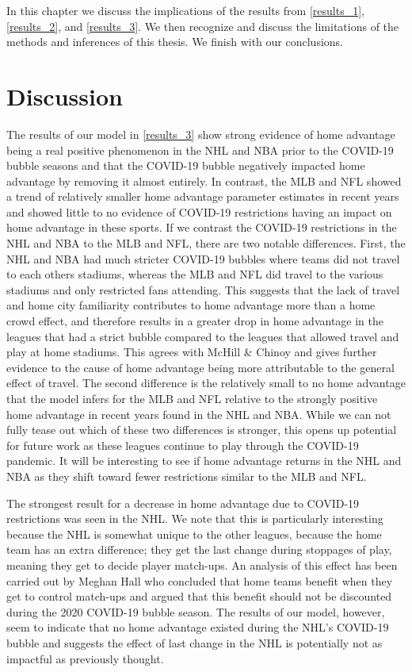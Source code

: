 In this chapter we discuss the implications of the results from \ref{results_1}, \ref{results_2}, and \ref{results_3}. We then recognize and discuss the limitations of the methods and inferences of this thesis. We finish with our conclusions.

\section{Discussion}

The results of our model in \ref{results_3} show strong evidence of home advantage being a real positive phenomenon in the NHL and NBA prior to the COVID-19 bubble seasons and that the COVID-19 bubble negatively impacted home advantage by removing it almost entirely. In contrast, the MLB and NFL showed a trend of relatively smaller home advantage parameter estimates in recent years and showed little to no evidence of COVID-19 restrictions having an impact on home advantage in these sports. If we contrast the COVID-19 restrictions in the NHL and NBA to the MLB and NFL, there are two notable differences. First, the NHL and NBA had much stricter COVID-19 bubbles where teams did not travel to each others stadiums, whereas the MLB and NFL did travel to the various stadiums and only restricted fans attending. This suggests that the lack of travel and home city familiarity contributes to home advantage more than a home crowd effect, and therefore results in a greater drop in home advantage in the leagues that had a strict bubble compared to the leagues that allowed travel and play at home stadiums. This agrees with McHill \& Chinoy \cite{McHill2020} and gives further evidence to the cause of home advantage being more attributable to the general effect of travel. The second difference is the relatively small to no home advantage that the model infers for the MLB and NFL relative to the strongly positive home advantage in recent years found in the NHL and NBA. While we can not fully tease out which of these two differences is stronger, this opens up potential for future work as these leagues continue to play through the COVID-19 pandemic. It will be interesting to see if home advantage returns in the NHL and NBA as they shift toward fewer restrictions similar to the MLB and NFL.

The strongest result for a decrease in home advantage due to COVID-19 restrictions was seen in the NHL. We note that this is particularly interesting because the NHL is somewhat unique to the other leagues, because the home team has an extra difference; they get the last change during stoppages of play, meaning they get to decide player match-ups. An analysis of this effect has been carried out by Meghan Hall \cite{Hall2020} who concluded that home teams benefit when they get to control match-ups and argued that this benefit should not be discounted during the 2020 COVID-19 bubble season. The results of our model, however, seem to indicate that no home advantage existed during the NHL's COVID-19 bubble and suggests the effect of last change in the NHL is potentially not as impactful as previously thought.

